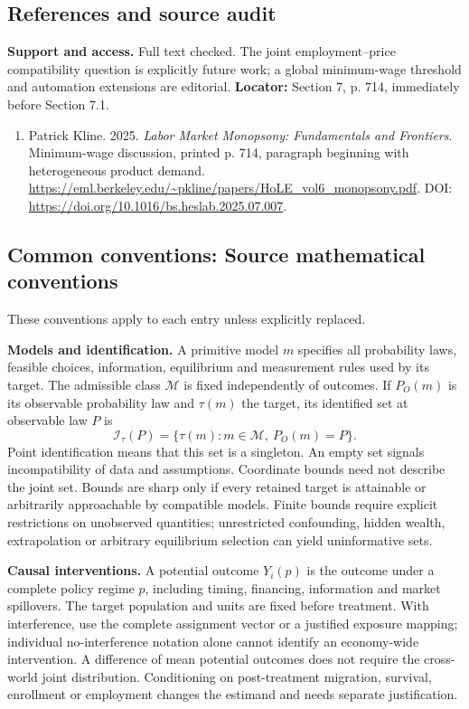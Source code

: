 \documentclass[11pt,a4paper]{article}
\begin{document}
\subsection*{References and source audit}
\textbf{Support and access.} Full text checked. The joint employment--price compatibility question is explicitly future work; a global minimum-wage threshold and automation extensions are editorial. \textbf{Locator:} Section 7, p. 714, immediately before Section 7.1.
\begin{enumerate}\raggedright
\item\hypertarget{definitions:source:30007633:1}{} Patrick Kline. 2025. \emph{Labor Market Monopsony: Fundamentals and Frontiers}. Minimum-wage discussion, printed p. 714, paragraph beginning with heterogeneous product demand.
\url{https://eml.berkeley.edu/~pkline/papers/HoLE_vol6_monopsony.pdf}.
DOI: \url{https://doi.org/10.1016/bs.heslab.2025.07.007}.
\end{enumerate}

\subsection*{Common conventions: Source mathematical conventions}

These conventions apply to each entry unless explicitly replaced.

\textbf{Models and identification.} A primitive model \(m\) specifies all probability laws, feasible choices, information, equilibrium and measurement rules used by its target. The admissible class \(\mathcal M\) is fixed independently of outcomes. If \(P_O(m)\) is its observable probability law and \(\tau(m)\) the target, its identified set at observable law \(P\) is
\[
 \mathcal I_\tau(P)=\{\tau(m):m\in\mathcal M,\ P_O(m)=P\}.
\]
Point identification means that this set is a singleton. An empty set signals incompatibility of data and assumptions. Coordinate bounds need not describe the joint set. Bounds are sharp only if every retained target is attainable or arbitrarily approachable by compatible models. Finite bounds require explicit restrictions on unobserved quantities; unrestricted confounding, hidden wealth, extrapolation or arbitrary equilibrium selection can yield uninformative sets.

\textbf{Causal interventions.} A potential outcome \(Y_i(p)\) is the outcome under a complete policy regime \(p\), including timing, financing, information and market spillovers. The target population and units are fixed before treatment. With interference, use the complete assignment vector or a justified exposure mapping; individual no-interference notation alone cannot identify an economy-wide intervention. A difference of mean potential outcomes does not require the cross-world joint distribution. Conditioning on post-treatment migration, survival, enrollment or employment changes the estimand and needs separate justification.
\end{document}
